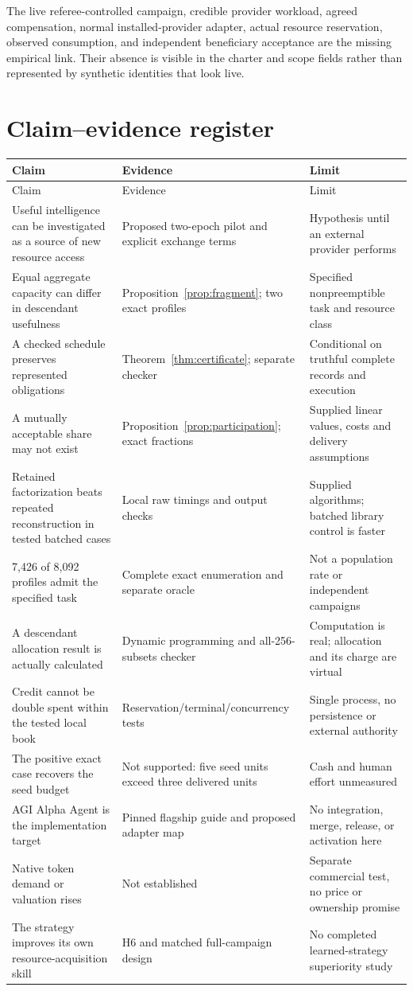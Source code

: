 \documentclass[11pt,letterpaper]{article}
\theoremstyle{remark}\newtheorem{remark}{Remark}[section]
\begin{document}
The live referee-controlled campaign, credible provider workload, agreed compensation, normal installed-provider adapter, actual resource reservation, observed consumption, and independent beneficiary acceptance are the missing empirical link. Their absence is visible in the charter and scope fields rather than represented by synthetic identities that look live.

\section{Claim--evidence register}
\small
\begin{longtable}{@{}P{.31\linewidth}P{.33\linewidth}P{.30\linewidth}@{}}\toprule
Claim & Evidence & Limit\\\midrule\endfirsthead
\toprule Claim & Evidence & Limit\\\midrule\endhead
Useful intelligence can be investigated as a source of new resource access & Proposed two-epoch pilot and explicit exchange terms & Hypothesis until an external provider performs\\
Equal aggregate capacity can differ in descendant usefulness & Proposition~\ref{prop:fragment}; two exact profiles & Specified nonpreemptible task and resource class\\
A checked schedule preserves represented obligations & Theorem~\ref{thm:certificate}; separate checker & Conditional on truthful complete records and execution\\
A mutually acceptable share may not exist & Proposition~\ref{prop:participation}; exact fractions & Supplied linear values, costs and delivery assumptions\\
Retained factorization beats repeated reconstruction in tested batched cases & Local raw timings and output checks & Supplied algorithms; batched library control is faster\\
7,426 of 8,092 profiles admit the specified task & Complete exact enumeration and separate oracle & Not a population rate or independent campaigns\\
A descendant allocation result is actually calculated & Dynamic programming and all-256-subsets checker & Computation is real; allocation and its charge are virtual\\
Credit cannot be double spent within the tested local book & Reservation/terminal/concurrency tests & Single process, no persistence or external authority\\
The positive exact case recovers the seed budget & Not supported: five seed units exceed three delivered units & Cash and human effort unmeasured\\
AGI Alpha Agent is the implementation target & Pinned flagship guide and proposed adapter map & No integration, merge, release, or activation here\\
Native token demand or valuation rises & Not established & Separate commercial test, no price or ownership promise\\
The strategy improves its own resource-acquisition skill & H6 and matched full-campaign design & No completed learned-strategy superiority study\\\bottomrule
\end{longtable}
\normalsize
\end{document}
